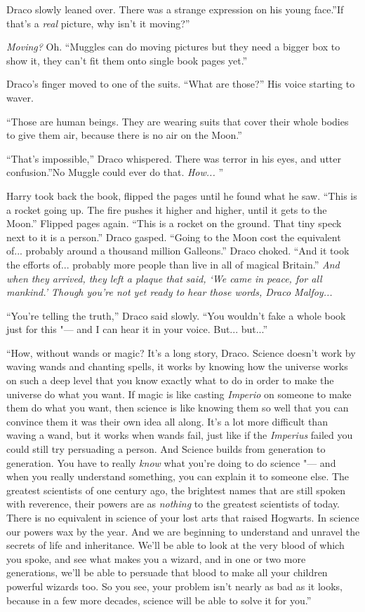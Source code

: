 Draco slowly leaned over. There was a strange expression on his young
face.''If that's a \emph{real} picture, why isn't it moving?''

\emph{Moving?} Oh. ``Muggles can do moving pictures but they need a
bigger box to show it, they can't fit them onto single book pages yet.''

Draco's finger moved to one of the suits. ``What are those?'' His voice
starting to waver.

``Those are human beings. They are wearing suits that cover their whole
bodies to give them air, because there is no air on the Moon.''

``That's impossible,'' Draco whispered. There was terror in his eyes,
and utter confusion.''No Muggle could ever do that. \emph{How...} ''

Harry took back the book, flipped the pages until he found what he saw.
``This is a rocket going up. The fire pushes it higher and higher, until
it gets to the Moon.'' Flipped pages again. ``This is a rocket on the
ground. That tiny speck next to it is a person.'' Draco gasped. ``Going
to the Moon cost the equivalent of... probably around a thousand
million Galleons.'' Draco choked. ``And it took the efforts of...
probably more people than live in all of magical Britain.'' \emph{And
when they arrived, they left a plaque that said, `We came in peace, for
all mankind.' Though you're not yet ready to hear those words, Draco
Malfoy...}

``You're telling the truth,'' Draco said slowly. ``You wouldn't fake a
whole book just for this "--- and I can hear it in your voice. But...
but...''

``How, without wands or magic? It's a long story, Draco. Science doesn't
work by waving wands and chanting spells, it works by knowing how the
universe works on such a deep level that you know exactly what to do in
order to make the universe do what you want. If magic is like casting
\emph{Imperio} on someone to make them do what you want, then science is
like knowing them so well that you can convince them it was their own
idea all along. It's a lot more difficult than waving a wand, but it
works when wands fail, just like if the \emph{Imperius} failed you could
still try persuading a person. And Science builds from generation to
generation. You have to really \emph{know} what you're doing to do
science "--- and when you really understand something, you can explain it
to someone else. The greatest scientists of one century ago, the
brightest names that are still spoken with reverence, their powers are
as \emph{nothing} to the greatest scientists of today. There is no
equivalent in science of your lost arts that raised Hogwarts. In science
our powers wax by the year. And we are beginning to understand and
unravel the secrets of life and inheritance. We'll be able to look at
the very blood of which you spoke, and see what makes you a wizard, and
in one or two more generations, we'll be able to persuade that blood to
make all your children powerful wizards too. So you see, your problem
isn't nearly as bad as it looks, because in a few more decades, science
will be able to solve it for you.''

